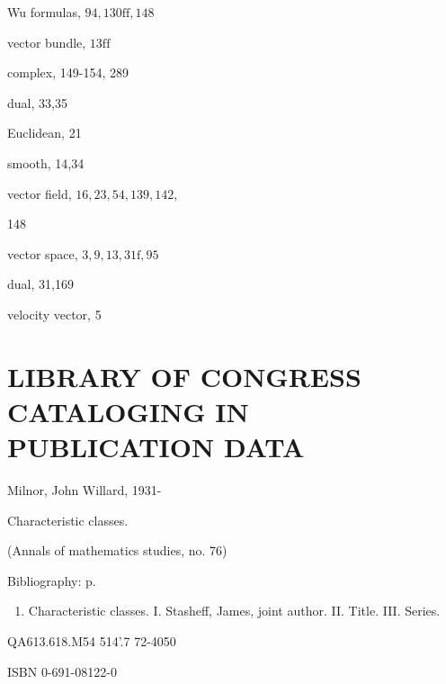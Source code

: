 \documentclass[10pt]{article}
\begin{document}
Wu formulas, $94,130 \mathrm{ff}, 148$

vector bundle, $13 \mathrm{ff}$

complex, 149-154, 289

dual, 33,35

Euclidean, 21

smooth, 14,34

vector field, $16,23,54,139,142$,

148

vector space, $3,9,13,31 \mathrm{f}, 95$

dual, 31,169

velocity vector, 5

\section{LIBRARY OF CONGRESS CATALOGING IN PUBLICATION DATA}
Milnor, John Willard, 1931-

Characteristic classes.

(Annals of mathematics studies, no. 76)

Bibliography: p.

\begin{enumerate}
  \item Characteristic classes. I. Stasheff, James, joint author. II. Title. III. Series.
\end{enumerate}
QA613.618.M54 514'.7 72-4050

ISBN 0-691-08122-0
\end{document}
